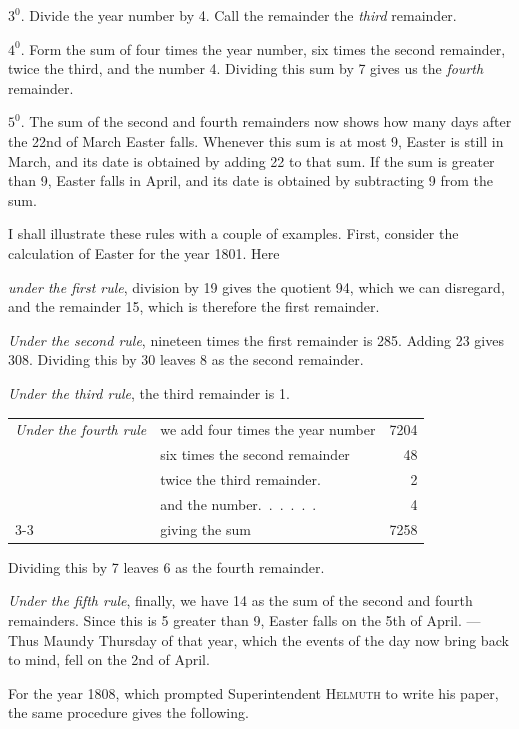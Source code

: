 $3^{0}$. Divide the year number by 4. Call the remainder the \textit{third} remainder.

$4^{0}$. Form the sum of four times the year number, six times the second remainder, twice the third, and the number 4. Dividing this sum by 7 gives us the \textit{fourth} remainder.

$5^{0}$. The sum of the second and fourth remainders now shows how many days after the 22nd of March Easter falls. Whenever this sum is at most 9, Easter is still in March, and its date is obtained by adding 22 to that sum. If the sum is greater than 9, Easter falls in April, and its date is obtained by subtracting 9 from the sum.

I shall illustrate these rules with a couple of examples. First, consider the calculation of Easter for the year 1801. Here

\textit{under the first rule}, division by 19 gives the quotient 94, which we can disregard, and the remainder 15, which is therefore the first remainder.

\textit{Under the second rule}, nineteen times the first remainder is 285. Adding 23 gives 308. Dividing this by 30 leaves 8 as the second remainder.

\textit{Under the third rule}, the third remainder is 1.
%

\begin{center}\small
\begin{tabular}{llr}
\textit{Under the fourth rule} & we add four times the year number &7204\\
& six times the second remainder &48\\
& twice the third remainder\quad . &2\\
& and the number\quad .\ .\ .\ .\ .\ . &4\\\cline{3-3}
&\hfill giving the sum &7258
\end{tabular}
\end{center}
Dividing this by 7 leaves 6 as the fourth remainder.

\textit{Under the fifth rule}, finally, we have 14 as the sum of the second and fourth remainders. Since this is 5 greater than 9, Easter falls on the 5th of April. — Thus Maundy Thursday of that year, which the events of the day now bring back to mind, fell on the 2nd of April.

For the year 1808, which prompted Superintendent \textsc{Helmuth} to write his paper, the same procedure gives the following.

